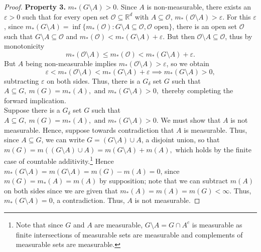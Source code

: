 \begin{proof}
\noindent \textbf{Property 3.} \( m_*(G \setminus A) > 0.  \) Since \( A \) is non-measurable, there exists an \( \varepsilon > 0 \) such that for every open set \( \mathcal{O} \subseteq \mathbb{R}^{d}  \) with \( A \subseteq \mathcal{O}  \), \( m_*(\mathcal{O} \setminus A) > \varepsilon . \) For this \( \varepsilon  \), since \( m_*(G \setminus A) = \inf \{ m_*(\mathcal{O}) : G\setminus A \subseteq  \mathcal{O} , \mathcal{O} \mbox{ open}  \}   \), there is an open set \( \mathcal{O}  \) such that \( G \setminus A \subseteq \mathcal{O}  \) and \( m_*(\mathcal{O}) < m_*(G \setminus A) + \varepsilon  \). But then \( \mathcal{O} \setminus A \subseteq \mathcal{O}  \), thus by monotonicity \[m_*(\mathcal{O} \setminus A) \leq m_*(\mathcal{O} ) < m_*(G \setminus A) + \varepsilon .   \] But \( A \) being non-measurable implies \( m_*(\mathcal{O} \setminus A) > \varepsilon   \), so we obtain \[\varepsilon < m_*(\mathcal{O} \setminus A) < m_*(G \setminus A) + \varepsilon \implies m_*(G\setminus A) > 0,\] subtracting \( \varepsilon  \) on both sides. Thus, there is a \( G_\delta  \) set \( G \) such that \( A \subseteq G, \ m(G) = m_*(A), \mbox{ and } m_*(G \setminus A) > 0, \) thereby completing the forward implication. \\

\noindent [\( \impliedby \)] Suppose there is a \( G_\delta  \) set \( G \) such that \( A \subseteq G, \ m(G) = m_*(A), \mbox{ and } m_*(G \setminus A) > 0.\) We must show that \( A \) is not measurable. Hence, suppose towards contradiction that \( A \) is measurable. Thus, since \( A \subseteq G \), we can write \( G = (G \setminus A) \cup A \), a disjoint union, so that \(m(G) = m((G \setminus A) \cup A) = m(G \setminus A) + m(A),\) which holds by the finite case of countable additivity.\footnote{Note that since \( G \) and \( A  \) are measurable, \( G\setminus A = G \cap A^{c}  \) is measurable as finite intersections of measurable sets are measurable and complements of measurable sets are measurable.} Hence \( m_*(G \setminus A) = m(G \setminus A)  = m(G) - m(A) = 0 \), since \( m(G) = m_*(A) = m(A) \) by supposition; note that we can subtract \( m(A) \) on both sides since we are given that \( m_*(A)=m(A)=m(G) < \infty \). Thus, \( m_*(G \setminus A) = 0 \), a contradiction. Thus, \( A \) is not measurable. 
\end{proof}

